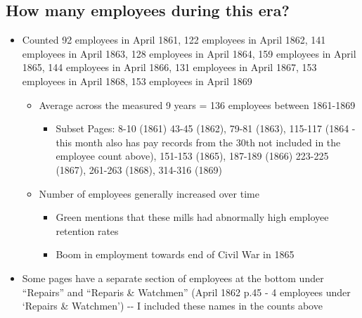 \documentclass[
  letterpaper,
  DIV=11,
  numbers=noendperiod]{scrartcl}
\providecommand{\tightlist}{%
  \setlength{\itemsep}{0pt}\setlength{\parskip}{0pt}}\usepackage{longtable,booktabs,array}
\begin{document}
\hypertarget{how-many-employees-during-this-era}{%
\subsection{How many employees during this
era?}\label{how-many-employees-during-this-era}}

\begin{itemize}
\item
  Counted 92 employees in April 1861, 122 employees in April 1862, 141
  employees in April 1863, 128 employees in April 1864, 159 employees in
  April 1865, 144 employees in April 1866, 131 employees in April 1867,
  153 employees in April 1868, 153 employees in April 1869

  \begin{itemize}
  \item
    Average across the measured 9 years = 136 employees between
    1861-1869

    \begin{itemize}
    \tightlist
    \item
      Subset Pages: 8-10 (1861) 43-45 (1862), 79-81 (1863), 115-117
      (1864 - this month also has pay records from the 30th not included
      in the employee count above), 151-153 (1865), 187-189 (1866)
      223-225 (1867), 261-263 (1868), 314-316 (1869)
    \end{itemize}
  \item
    Number of employees generally increased over time

    \begin{itemize}
    \tightlist
    \item
      Green mentions that these mills had abnormally high employee
      retention rates
    \item
      Boom in employment towards end of Civil War in 1865
    \end{itemize}
  \end{itemize}
\item
  Some pages have a separate section of employees at the bottom under
  ``Repairs'' and ``Reparis \& Watchmen'' (April 1862 p.45 - 4 employees
  under `Repairs \& Watchmen') -\/- I included these names in the counts
  above


\end{itemize}
\end{document}

